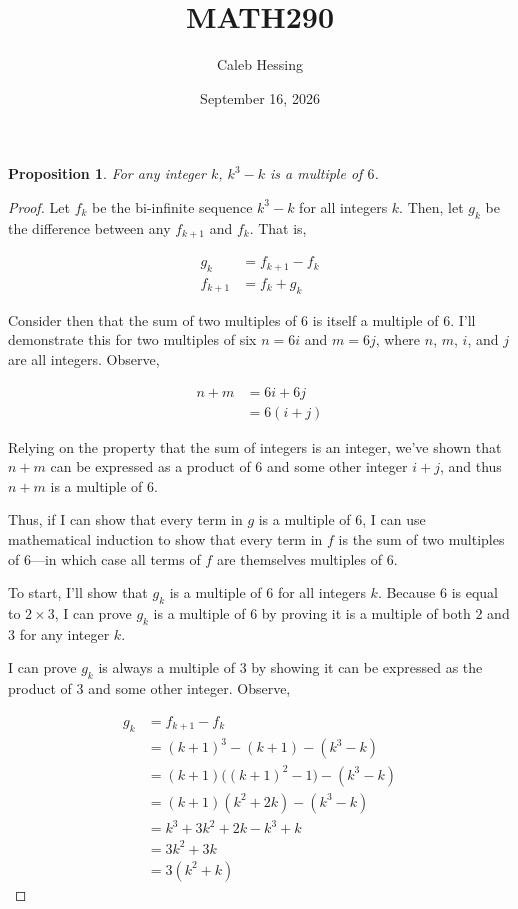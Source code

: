 \documentclass{article} %
\title{MATH290}
\author{Caleb Hessing}
\date{September 16, 2026}
\newtheorem{proposition}{Proposition}
\begin{document}
\maketitle

\begin{proposition}
    For any integer $k$, $k^3 - k$ is a multiple of $6$.
\end{proposition}

\begin{proof}\nobreakspace

    Let $f_k$ be the bi-infinite sequence $k^3 - k$ for all integers $k$. Then, let $g_k$ be 
    the difference between any $f_{k+1}$ and $f_{k}$. That is,

    \[
    \begin{aligned}
        g_k &= f_{k+1} - f_{k} \\
        f_{k+1} &= f_k + g_k
    \end{aligned}
    \]

    Consider then that the sum of two multiples of $6$ is itself a multiple of $6$. I'll
    demonstrate this for two multiples of six $n = 6i$ and $m = 6j$, where $n$, $m$, $i$, and
    $j$ are all integers. Observe,

    \[
    \begin{aligned}
    n + m &= 6i + 6j \\
    &= 6(i + j)
    \end{aligned}
    \]

    Relying on the property that the sum of integers is an integer, we've shown that $n + m$
    can be expressed as a product of $6$ and some other integer $i + j$, and thus $n + m$ is
    a multiple of $6$.

    Thus, if I can show that every term in $g$ is a multiple of $6$, I can use mathematical
    induction to show that every term in $f$ is the sum of two multiples of $6$---in which case
    all terms of $f$ are themselves multiples of $6$.

    To start, I'll show that $g_k$ is a multiple of $6$ for 
    all integers $k$. Because $6$ is equal to $2 \times 3$, I can prove $g_k$ is a 
    multiple of $6$ by proving it is a multiple of both $2$ and $3$ for any integer $k$. 
    
    I can prove $g_k$ is always a multiple of $3$ by showing it can be 
    expressed as the product of $3$ and some other integer. Observe,

    \[
    \begin{aligned}
        g_k &= f_{k+1} - f_k \\
            &= (k+1)^3 - (k+1) - (k^3 - k) \\
            &= (k+1)\big((k+1)^2 - 1\big) - (k^3 - k) \\
            &= (k+1)(k^2 + 2k) - (k^3 - k) \\
            &= k^3 + 3k^2 + 2k - k^3 + k \\
            &= 3k^2 + 3k \\
            &= 3(k^2 + k)
    \end{aligned}
    \]


\end{proof}
\end{document}
